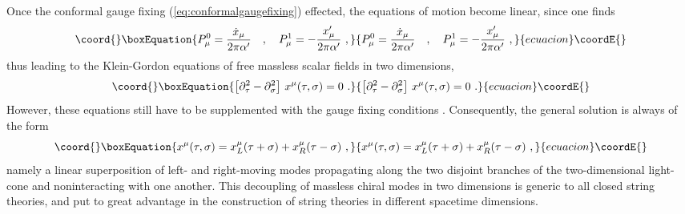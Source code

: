 \documentclass[a4paper,11pt]{article}
\begin{document}
Once the conformal gauge fixing (\ref{eq:conformalgaugefixing}) effected,
the equations of motion become linear, since one finds
\begin{equation}\coord{}\boxEquation{
P^0_\mu=\frac{\dot{x}_\mu}{2\pi\alpha'}\ \ \ ,\ \ \ 
P^1_\mu=-\frac{x'_\mu}{2\pi\alpha'}\ ,
}{
P^0_\mu=\frac{\dot{x}_\mu}{2\pi\alpha'}\ \ \ ,\ \ \ 
P^1_\mu=-\frac{x'_\mu}{2\pi\alpha'}\ ,
}{ecuacion}\coordE{}\end{equation}
thus leading to the Klein-Gordon equations of \coordHE{} free massless scalar 
fields in two dimensions,
\begin{equation}\coord{}\boxEquation{
\left[\partial^2_\tau-\partial^2_\sigma\right]\,x^\mu(\tau,\sigma)=0\ .
}{
\left[\partial^2_\tau-\partial^2_\sigma\right]\,x^\mu(\tau,\sigma)=0\ .
}{ecuacion}\coordE{}\end{equation}
However, these equations still have to be supplemented with the
gauge fixing conditions \coordHE{}. Consequently, the general
solution is always of the form
\begin{equation}\coord{}\boxEquation{
x^\mu(\tau,\sigma)=x^\mu_L(\tau+\sigma)+x^\mu_R(\tau-\sigma)\ ,
}{
x^\mu(\tau,\sigma)=x^\mu_L(\tau+\sigma)+x^\mu_R(\tau-\sigma)\ ,
}{ecuacion}\coordE{}\end{equation}
namely a linear superposition of left- and right-moving modes
propagating along the two disjoint branches of the
two-dimensional light-cone and noninteracting
with one another. This decoupling of massless chiral modes in two dimensions
is generic to all closed string theories, and put to great advantage in
the construction of string theories in different spacetime 
dimensions.\cite{Pol,GSW}
\end{document}
